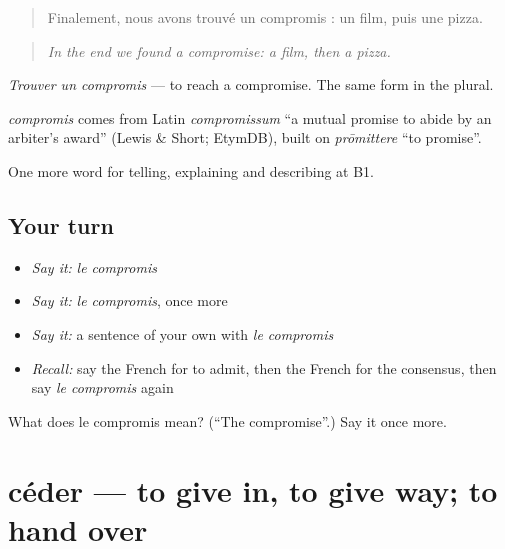 \begin{quote}
Finalement, nous avons trouvé un compromis : un film, puis une pizza.
\end{quote}

\begin{quote}
\emph{In the end we found a compromise: a film, then a pizza.}
\end{quote}

\emph{Trouver un compromis} — to reach a compromise. The same form in the plural.

\begin{cousinweb}
\emph{compromis} comes from Latin \emph{compromissum} \textquotedblleft{}a mutual promise to abide by an arbiter's award\textquotedblright{} (Lewis \& Short; EtymDB), built on \emph{prōmittere} \textquotedblleft{}to promise\textquotedblright{}.
\end{cousinweb}

\begin{grammarlens}[title={What you've built}]
One more word for telling, explaining and describing at B1.
\end{grammarlens}

\subsection*{Your turn}
\begin{itemize}
\raggedright
  \item \emph{Say it:} \emph{le compromis}
  \item \emph{Say it:} \emph{le compromis}, once more
  \item \emph{Say it:} a sentence of your own with \emph{le compromis}
  \item \emph{Recall:} say the French for to admit, then the French for the consensus, then say \emph{le compromis} again
\end{itemize}

\begin{tcolorbox}[breakable,colback=teal!4,colframe=teal!35!black,title={Before you move on}]
What does le compromis mean? (\textquotedblleft{}The compromise\textquotedblright{}.) Say it once more.
\end{tcolorbox}
\section[céder]{céder — to give in, to give way; to hand over}

\label{lesson:FR-C337-ceder}



